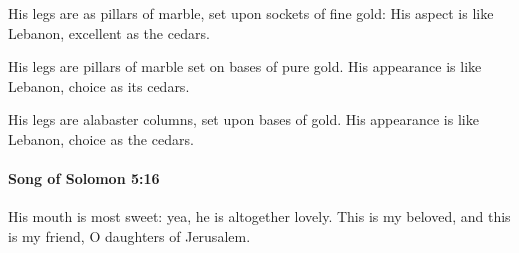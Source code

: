 			\begin{versebox}
					\item[BHS] 
					\item[LXX] 
					\item[ASV] His legs are as pillars of marble, set upon sockets of fine gold: His aspect is like Lebanon, excellent as the cedars.
					\item[NIV] His legs are pillars of marble set on bases of pure gold. His appearance is like Lebanon, choice as its cedars.
					\item[NRSV] His legs are alabaster columns, set upon bases of gold. His appearance is like Lebanon, choice as the cedars.
			\end{versebox}

		\paragraph{Song of Solomon 5:16} %
			\label{SONGOFSOLOMON-5-16}

			His mouth is most sweet: yea, he is altogether lovely. This is my beloved, and this is my friend, O daughters of Jerusalem.

